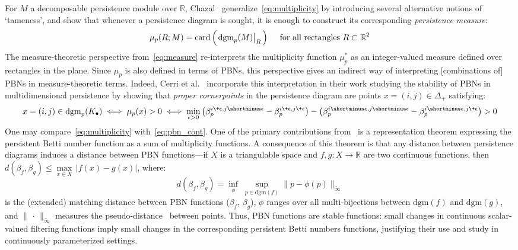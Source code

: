 For $M$ a decomposable persistence module over $\mathbb{R}$, Chazal~\cite{chazal2016structure} generalize~\eqref{eq:multiplicity} by introducing several alternative notions of `tameness', and show that whenever a persistence diagram is sought, it is enough to construct its corresponding \emph{persistence measure}:
\begin{equation}\label{eq:measure}
	\mu_p(R; M) = \mathrm{card}\left( \,
	\restr{\mathrm{dgm}_p(M)}{R} \,
	\right) \quad \text{ for all rectangles } R \subset \mathbb{R}^2 
\end{equation}
The measure-theoretic perspective from~\eqref{eq:measure} re-interprets the multiplicity function $\mu^\ast_p$ as an integer-valued measure defined over rectangles in the plane. Since $\mu_p$ is also defined in terms of PBNs, this perspective gives an indirect way of interpreting [combinations of] PBNs in measure-theoretic terms. Indeed, Cerri et al.~\cite{cerri2013betti} incorporate this interpretation in their work studying the stability of PBNs in multidimensional persistence by showing that \emph{proper cornerpoints} in the persistence diagram are points $x = (i,j) \in \Delta_+$ satisfying:
\begin{equation}\label{eq:pbn_cont}
	x = (i,j) \in \mathrm{dgm}_p(K_\bullet) \; \Longleftrightarrow \; \mu_p(x) > 0 \; \Longleftrightarrow \; \min_{\epsilon > 0} \left(\beta_p^{i \+ \epsilon, j \shortminus \epsilon} - \beta_p^{i \+ \epsilon, j \+ \epsilon} \right) - \left(\beta_p^{i \shortminus \epsilon, j \shortminus \epsilon} - \beta_p^{i \shortminus \epsilon, j \+ \epsilon} \right) > 0
\end{equation}
One may compare~\eqref{eq:multiplicity} with~\eqref{eq:pbn_cont}. One of the primary contributions from~\cite{cerri2013betti} is a representation theorem expressing the persistent Betti number function as a sum of multiplicity functions. A consequence of this theorem is that any distance between persistence diagrams induces a distance between PBN functions---if $X$ is a triangulable space and $f,g : X \to \mathbb{R}$ are two continuous functions, then $d(\beta_f, \beta_g) \leq \max\limits_{x \in X} \, \lvert f(x) - g(x) \rvert$, where:
\begin{equation*}
	d(\beta_f, \beta_g) = \inf\limits_{\phi} \; \sup\limits_{p \in \mathrm{dgm}(f)} \lVert p - \phi(p) \rVert_{\widetilde{\infty} }
\end{equation*}
is the (extended) matching distance between PBN functions ($\beta_f$, $\beta_g$), $\phi$ ranges over all multi-bijections between $\mathrm{dgm}(f)$ and $\mathrm{dgm}(g)$, and $\lVert \,\cdot \, \rVert_{\widetilde{\infty}}$ measures the pseudo-distance~\cite{cerri2013betti} between points.
Thus, PBN functions are stable functions: small changes in continuous scalar-valued filtering functions imply small changes in the corresponding persistent Betti numbers functions, justifying their use and study in continuously parameterized settings. 

